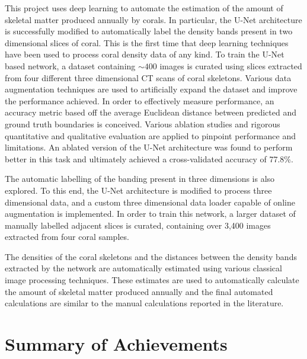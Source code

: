 This project uses deep learning to automate the estimation of the amount of skeletal matter produced annually by corals. In particular, the U-Net architecture is successfully modified to automatically label the density bands present in two dimensional slices of coral. This is the first time that deep learning techniques have been used to process coral density data of any kind. To train the U-Net based network, a dataset containing ${\sim}400$ images is curated using slices extracted from four different three dimensional CT scans of coral skeletons. Various data augmentation techniques are used to artificially expand the dataset and improve the performance achieved. In order to effectively measure performance, an accuracy metric based off the average Euclidean distance between predicted and ground truth boundaries is conceived. Various ablation studies and rigorous quantitative and qualitative evaluation are applied to pinpoint performance and limitations. An ablated version of the U-Net architecture was found to perform better in this task and ultimately achieved a cross-validated accuracy of 77.8\%.

The automatic labelling of the banding present in three dimensions is also explored. To this end, the U-Net architecture is modified to process three dimensional data, and a custom three dimensional data loader capable of online augmentation is implemented. In order to train this network, a larger dataset of manually labelled adjacent slices is curated, containing over 3,400 images extracted from four coral samples.


The densities of the coral skeletons and the distances between the density bands extracted by the network are automatically estimated using various classical image processing techniques. These estimates are used to automatically calculate the amount of skeletal matter produced annually and the final automated calculations are similar to the manual calculations reported in the literature.

\section*{Summary of Achievements}

